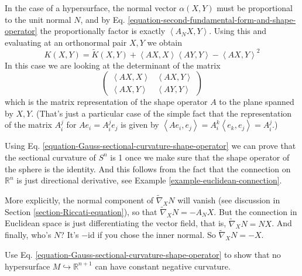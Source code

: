 In the case of a hypersurface, the normal vector $\alpha(X,Y)$ must be
proportional to the unit normal $N$, and by Eq.
\ref{equation-second-fundamental-form-and-shape-operator} the proportionally
factor is exactly $\left<A_N X,Y\right>$. Using this and evaluating
 at an orthonormal pair $X,Y$ we obtain
\begin{equation}
\label{equation-Gauss-sectional-curvature-shape-operator}
K(X,Y)=\tilde{K}(X,Y)+\left<AX,X\right>\left<AY,Y\right>-\left<AX,Y\right>^2
\end{equation}
In this case we are looking at the determinant of the matrix
\begin{equation}
\label{equation-matrix-of-shape-operator}
\begin{pmatrix}
\left<AX,X\right>&\left<AX,Y\right>\\ 
\left<AX,Y\right>&\left<AY,Y\right>
\end{pmatrix}
\end{equation}
which is the matrix representation of the shape operator $A$ to the plane
spanned by $X,Y$. (That's just a particular case of the simple fact that the
representation of the matrix $A_i^j$ for $Ae_i=A_i^je_j$ is given by
$\left<Ae_i,e_j\right>=A^k_i\left<e_k,e_j\right>=A^j_i$.)

\begin{example}
\label{example-sectional-curvature-of-sphere}
Using Eq. \ref{equation-Gauss-sectional-curvature-shape-operator} we can prove that the sectional
curvature of $S^n$ is 1 once we make sure that the shape operator of the sphere
is the identity. And this follows from the fact that the connection on
$\mathbb{R}^n$ is just directional derivative, see Example 
\ref{example-euclidean-connection}.

More explicitly, the normal component of $\tilde{\nabla}_X N$ will vanish (see
discussion in Section \ref{section-Riccati-equation}), so that
$\tilde{\nabla}_XN=-A_N X$. But the connection in Euclidean space is just
differentiating the vector field, that is, $\tilde{\nabla}_X N=N X$. And
finally, who's $N$? It's $-\text{id}$ if you chose the inner normal. So
 $\tilde{\nabla}_X N=-X$.
\end{example}

\begin{exercise}
\label{exercise-Gauss-sectional}
Use Eq. \ref{equation-Gauss-sectional-curvature-shape-operator} to show that no 
hypersurface $M \hookrightarrow \mathbb{R}^{n+1}$ can have constant negative 
curvature.
\end{exercise}

